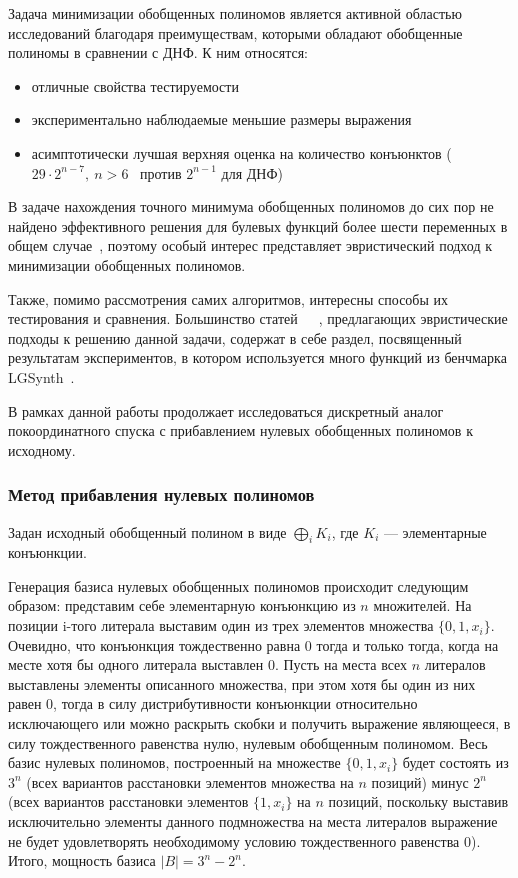 \documentclass[a4paper,12pt,titlepage,finall]{article}
\begin{document}
Задача минимизации обобщенных полиномов является активной областью исследований благодаря преимуществам, которыми обладают обобщенные полиномы в сравнении с ДНФ. К ним относятся:
\begin{itemize}
    \item отличные свойства тестируемости~\cite{exorcism4}
    \item экспериментально наблюдаемые меньшие размеры выражения
    \item асимптотически лучшая верхняя оценка на количество конъюнктов ($ 29 \cdot 2^{n - 7}, \ n > 6 $~\cite{bound} против $ 2^{n - 1} $ для ДНФ)
\end{itemize}

В задаче нахождения точного минимума обобщенных полиномов до сих пор не найдено эффективного решения для булевых функций более шести переменных в общем случае~\cite{exact}, поэтому особый интерес представляет эвристический подход к минимизации обобщенных полиномов.

Также, помимо рассмотрения самих алгоритмов, интересны способы их тестирования и сравнения. Большинство статей~\cite{exmin2}~\cite{mint}~\cite{exorcism4}, предлагающих эвристические подходы к решению данной задачи, содержат в себе раздел, посвященный результатам экспериментов, в котором используется много функций из бенчмарка LGSynth~\cite{benchmark}.

В рамках данной работы продолжает исследоваться дискретный аналог покоординатного спуска с прибавлением нулевых обобщенных полиномов к исходному.

\subsubsection*{Метод прибавления нулевых полиномов}

Задан исходный обобщенный полином в виде $ \bigoplus\limits_i K_i $, где $ K_i $ --- элементарные конъюнкции.

Генерация базиса нулевых обобщенных полиномов происходит следующим образом: представим себе элементарную конъюнкцию из $ n $ множителей. На позиции i-того литерала выставим один из трех элементов множества $ \{ 0, 1, x_i \} $. Очевидно, что конъюнкция тождественно равна 0 тогда и только тогда, когда на месте хотя бы одного литерала выставлен 0. Пусть на места всех $ n $ литералов выставлены элементы описанного множества, при этом хотя бы один из них равен 0, тогда в силу дистрибутивности конъюнкции относительно исключающего или можно раскрыть скобки и получить выражение являющееся, в силу тождественного равенства нулю, нулевым обобщенным полиномом. Весь базис нулевых полиномов, построенный на множестве $ \{ 0, 1, x_i \} $ будет состоять из $ 3^n $ (всех вариантов расстановки элементов множества на $ n $ позиций) минус $ 2^n $ (всех вариантов расстановки элементов $ \{ 1, x_i \} $ на $ n $ позиций, поскольку выставив исключительно элементы данного подмножества на места литералов выражение не будет удовлетворять необходимому условию тождественного равенства 0). Итого, мощность базиса $ \left| B \right| = 3^n - 2^n. $
\end{document}
